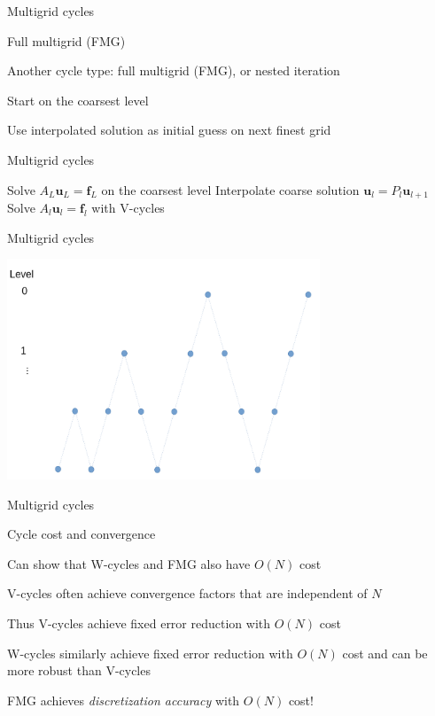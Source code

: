 \documentclass[18pt,xcolor=table]{beamer}
\begin{document}
\begin{frame}{Multigrid cycles}
\begin{block}{Full multigrid (FMG)}
\bit
\item Another cycle type: full multigrid (FMG), or nested iteration
\item Start on the coarsest level
\item Use interpolated solution as initial guess on next finest grid
\eit
\end{block}
\end{frame}

\begin{frame}{Multigrid cycles}
\begin{algorithm}[H]
\caption{Full multigrid (FMG)}
\begin{algorithmic}
\State Solve $A_L\mathbf{u}_L = \mathbf{f}_L$ on the coarsest level
\State Interpolate coarse solution $\mathbf{u}_l = P_l\mathbf{u}_{l+1}$
\State Solve $A_l\mathbf{u}_l = \mathbf{f}_l$ with V-cycles
\EndFor
\end{algorithmic}
\end{algorithm}
\end{frame}

\begin{frame}{Multigrid cycles}
\begin{center}
\includegraphics[width=0.7\textwidth]{../figures/FMGcycle}
\end{center}
\end{frame}

\begin{frame}{Multigrid cycles}
\begin{block}{Cycle cost and convergence}
\bit
\item Can show that W-cycles and FMG also have $O(N)$ cost
\item V-cycles often achieve convergence factors that are independent of $N$
\item Thus V-cycles achieve fixed error reduction with $O(N)$ cost
\item W-cycles similarly achieve fixed error reduction with $O(N)$ cost and can be more robust than V-cycles
\item FMG achieves \emph{discretization accuracy} with $O(N)$ cost!
\eit
\end{block}
\end{frame}

\end{document}
